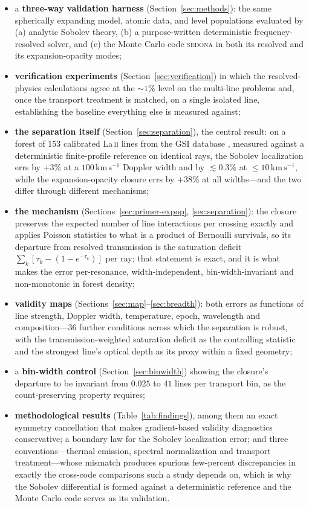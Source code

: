 \documentclass[fleqn,usenatbib]{mnras}
\newcommand{\kms}{\,\mathrm{km\,s^{-1}}}
\begin{document}
\begin{itemize}
  \item a \textbf{three-way validation harness}
  (Section~\ref{sec:methods}): the same spherically expanding model, atomic
  data, and level populations evaluated by (a) analytic Sobolev theory, (b) a
  purpose-written deterministic frequency-resolved solver, and (c) the Monte
  Carlo code \textsc{sedona} \citep{sedona} in both its resolved and its
  expansion-opacity modes;
  \item \textbf{verification experiments} (Section~\ref{sec:verification})
  in which the resolved-physics calculations agree at the $\sim1\%$ level on
  the multi-line problems and, once the transport treatment is matched, on a
  single isolated line, establishing the baseline everything else is measured
  against;
  \item \textbf{the separation itself} (Section~\ref{sec:separation}), the
  central result: on a forest of 153 calibrated La\,\textsc{ii} lines from
  the GSI database \citep{gsi_atomic,gsi_zenodo}, measured against a
  deterministic finite-profile reference on identical rays, the Sobolev
  localization errs by $+3\%$ at a $100\kms$ Doppler width and by
  $\lesssim0.3\%$ at $\le10\kms$, while the expansion-opacity closure errs by
  $+38\%$ at all widths---and the two differ through different mechanisms;
  \item \textbf{the mechanism} (Sections~\ref{sec:primer-expop},
  \ref{sec:separation}): the closure preserves the expected number of line
  interactions per crossing exactly and applies Poisson statistics to what is
  a product of Bernoulli survivals, so its departure from resolved
  transmission is the saturation deficit $\sum_k[\tau_k-(1-e^{-\tau_k})]$ per
  ray; that statement is exact, and it is what makes the error per-resonance,
  width-independent, bin-width-invariant and non-monotonic in forest density;
  \item \textbf{validity maps} (Sections~\ref{sec:map}--\ref{sec:breadth}):
  both errors as functions of line strength, Doppler width, temperature,
  epoch, wavelength and composition---36 further conditions across which the
  separation is robust, with the transmission-weighted saturation deficit as
  the controlling statistic and the strongest line's optical depth as its
  proxy within a fixed geometry;
  \item a \textbf{bin-width control} (Section~\ref{sec:binwidth}) showing the
  closure's departure to be invariant from $0.025$ to $41$ lines per transport
  bin, as the count-preserving property requires;
  \item \textbf{methodological results} (Table~\ref{tab:findings}), among them
  an exact symmetry cancellation that makes gradient-based validity diagnostics
  conservative; a boundary law for the Sobolev localization error; and three
  conventions---thermal emission, spectral normalization and transport
  treatment---whose mismatch produces spurious few-percent discrepancies in
  exactly the cross-code comparisons such a study depends on, which is why the
  Sobolev differential is formed against a deterministic reference and the
  Monte Carlo code serves as its validation.
\end{itemize}
\end{document}

